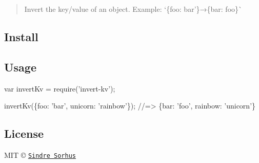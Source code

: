\begin{quote}
Invert the key/value of an object. Example\+: `\{foo\+: \textquotesingle{}bar'\}{\ttfamily →}\{bar\+: \textquotesingle{}foo\textquotesingle{}\}\`{} \end{quote}


\subsection*{Install}




\subsection*{Usage}


\begin{DoxyCode}
var invertKv = require('invert-kv');

invertKv(\{foo: 'bar', unicorn: 'rainbow'\});
//=> \{bar: 'foo', rainbow: 'unicorn'\}
\end{DoxyCode}


\subsection*{License}

M\+IT © \href{http://sindresorhus.com}{\tt Sindre Sorhus} 